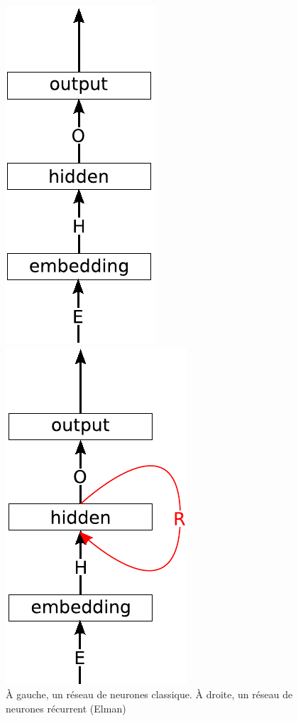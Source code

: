 \documentclass[12pt,a4paper,times,twoside,openright]{report}
\begin{document}
\begin{figure}[ht!]
\begin{minipage}{0.49\linewidth}
\centering
\includegraphics[scale=0.75]{images/NN/FFNN}
\end{minipage}
\begin{minipage}{0.49\linewidth}
\centering
\includegraphics[scale=0.75]{images/NN/Elman-RNN}
\end{minipage}
\caption{À gauche, un réseau de neurones classique. À droite, un réseau de neurones récurrent (Elman)}
\label{fig:FFNN-vs-RNN}
\end{figure}
\end{document}
